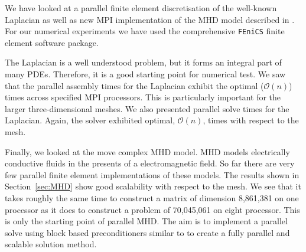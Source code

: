 \documentclass[10pt]{article}
\newcommand{\fenics}{{\tt FEniCS} }
\begin{document}
We have looked at a parallel finite element discretisation of the well-known Laplacian as well as new MPI implementation of the MHD model described in \cite{schotzau2004mixed}. For our numerical experiments we have used the comprehensive \fenics finite element software package.

The Laplacian is a well understood problem, but it forms an integral part of many PDEs. Therefore, it is a good starting point for numerical test. We saw that the parallel assembly times for the Laplacian exhibit the optimal ($\mathcal{O}(n)$) times across specified MPI processors. This is particularly important for the larger three-dimensional meshes. We also presented parallel solve times for the Laplacian. Again, the solver exhibited optimal, $\mathcal{O}(n)$, times with respect to the mesh.

Finally, we looked at the move complex MHD model. MHD models electrically conductive fluids in the presents of a electromagnetic field. So far there are very few parallel finite element implementations of these models. The results shown in Section~\ref{sec:MHD} show good scalability with respect to the mesh. We see that it takes roughly the same time to construct a matrix of dimension 8,861,381 on one processor as it does to construct a problem of 70,045,061 on eight processor. This is only the starting point of parallel MHD. The aim is to implement a parallel solve using block based preconditioners similar to \cite{phillips2014block,mythesis} to create a fully parallel and scalable solution method.




\end{document}
